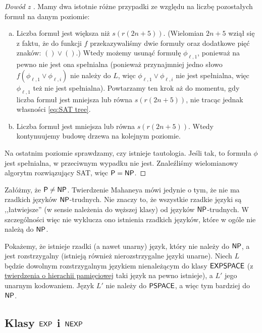 \begin{proof}[Dowód z \cite{Grochow16}]
    Mamy dwa istotnie różne przypadki ze względu na liczbę pozostałych formuł na danym poziomie:
    \begin{enumerate}[(a)]
        \item Liczba formuł jest większa niż $s(r(2n + 5))$. (Wielomian $2n + 5$ wziął się z faktu, że do funkcji $f$ przekazywaliśmy dwie formuły oraz dodatkowe pięć znaków: $() \lor ()$.)
        Wtedy możemy usunąć formułę $\phi_{\ell, 1}$, ponieważ na pewno nie jest ona spełnialna (ponieważ przynajmniej jedno słowo $f(\phi_{\ell, 1} \lor \phi_{\ell, i})$ nie należy do $L$, więc $\phi_{\ell, 1} \lor \phi_{\ell, i}$ nie jest spełnialna, więc $\phi_{\ell, 1}$ też nie jest spełnialna).
        Powtarzamy ten krok aż do momentu, gdy liczba formuł jest mniejsza lub równa $s(r(2n + 5))$, nie tracąc jednak własności \ref{eq:SAT tree}.
        \item Liczba formuł jest mniejsza lub równa $s(r(2n + 5))$. Wtedy kontynuujemy budowę drzewa na kolejnym poziomie.
    \end{enumerate}

    Na ostatnim poziomie sprawdzamy, czy istnieje tautologia. Jeśli tak, to formuła $\phi$ jest spełnialna, w przeciwnym wypadku nie jest.
    Znaleźliśmy wielomianowy algorytm rozwiązujący SAT, więc $\textsf{P} = \textsf{NP}$.
\end{proof}

\begin{remark}
    Załóżmy, że $\textsf{P} \neq \textsf{NP}$. Twierdzenie Mahaneya mówi jedynie o tym, że nie ma rzadkich języków $\textsf{NP}$-trudnych. Nie znaczy to, że wszystkie rzadkie języki są ,,łatwiejsze'' (w sensie należenia do węższej klasy) od języków $\textsf{NP}$-trudnych. W szczególności więc nie wyklucza ono istnienia rzadkich języków, które w ogóle nie należą do $\textsf{NP}$.

    Pokażemy, że istnieje rzadki (a nawet unarny) język, który nie należy do $\textsf{NP}$, a jest rozstrzygalny (istnieją również nierozstrzygalne języki unarne).
    Niech $L$ będzie dowolnym rozstrzygalnym językiem nienależącym do klasy $\textsf{EXPSPACE}$ (z \href{https://en.wikipedia.org/wiki/Space_hierarchy_theorem}{twierdzenia o hierachii pamięciowej} taki język na pewno istnieje), a $L'$ jego unarnym kodowaniem. Język $L'$ nie należy do $\textsf{PSPACE}$, a więc tym bardziej do $\textsf{NP}$.
\end{remark}

\subsection{Klasy $\textsf{EXP}$ i $\textsf{NEXP}$}

